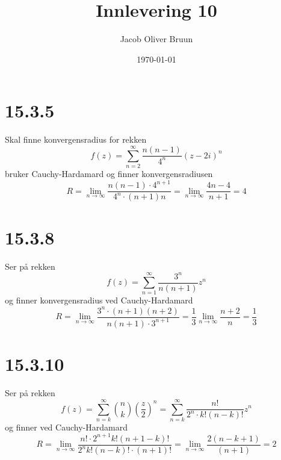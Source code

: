 \documentclass{report}
\title{Innlevering 10}
\author{Jacob Oliver Bruun}
\date{\today}
\newcommand{\nbrack}[1]{\left( #1 \right)}
\newcommand{\limtoinf}[1]{\lim_{#1 \rightarrow \infty}}
\begin{document}
\section*{15.3.5}
Skal finne konvergensradius for rekken
\begin{equation}
  \label{eq:1}
  f(z) = \sum_{n=2}^{\infty} \frac{n(n-1)}{4^{n}} \nbrack{ z-2i }^{n}
\end{equation}
bruker Cauchy-Hardamard og finner konvergensradiusen
\begin{equation}
  \label{eq:2}
  R = \limtoinf{n} \frac{ n(n-1) \cdot 4^{n+1} }{4^{n} \cdot (n+1)n} = \limtoinf{n} \frac{4n - 4}{n + 1} = 4
\end{equation}


\section*{15.3.8}
Ser på rekken
\begin{equation}
  \label{eq:5}
  f(z) = \sum_{n=1}^{\infty} \frac{3^{n}}{n(n+1)}z^{n}
\end{equation}
og finner konvergensradius ved Cauchy-Hardamard
\begin{equation}
  \label{eq:6}
  R = \limtoinf{n} \frac{3^{n} \cdot (n+1)(n+2)}{n(n+1) \cdot 3^{n+1}} = \frac{1}{3} \limtoinf{n} \frac{n+2}{n} = \frac{1}{3}
\end{equation}


\section*{15.3.10}
Ser på rekken
\begin{equation}
  \label{eq:8}
  f(z) = \sum_{n=k}^{\infty} \binom{n}{k} \nbrack{\frac{z}{2}}^{n} = \sum_{n=k}^{\infty} \frac{n!}{2^{n} \cdot k! \nbrack{ n-k }!} z^{n}
\end{equation}
og finner ved Cauchy-Hardamard
\begin{equation}
  \label{eq:9}
  R = \limtoinf{n} \frac{n! \cdot 2^{n+1} k! (n+1-k)!}{2^{n}k! (n-k)! \cdot (n+1)!} = \limtoinf{n} \frac{2 (n-k+1)}{(n+1)} = 2
\end{equation}
\end{document}

